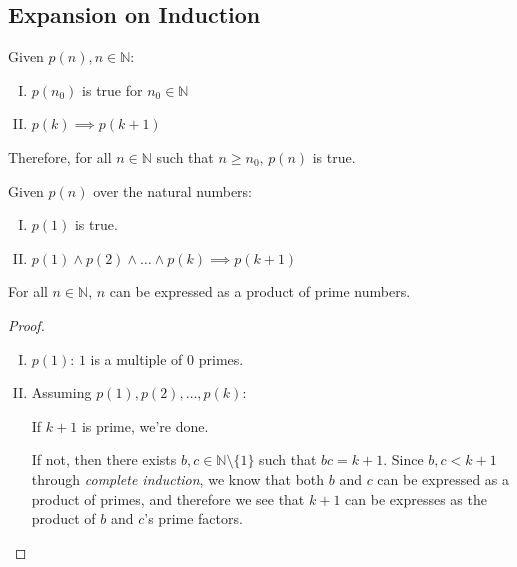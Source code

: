 \documentclass[00_complete]{subfiles}
\begin{document}
\subsection{Expansion on Induction}
\setcounter{example}{0}
\begin{theorem}
    Given $p(n), n \in \mathbb{N}$:
    \begin{enumerate}[I.]
        \item $p(n_0)$ is true for $n_0 \in \mathbb{N}$
        \item $p(k)\implies p(k+1)$
    \end{enumerate}
    Therefore, for all $n \in \mathbb{N}$ such that $n \geq n_0$, $p(n)$ is
    true.
\end{theorem}
\begin{theorem}
    Given $p(n)$ over the natural numbers:
    \begin{enumerate}[I.]
        \item $p(1)$ is true.
        \item $p(1)\land p(2) \land \dots \land p(k) \implies p(k+1)$
    \end{enumerate}
\end{theorem}
\begin{example}
    For all $n \in \mathbb{N}$, $n$ can be expressed as a product of prime
    numbers.
    \begin{proof}
        \begin{enumerate}[I.]
            \item $p(1)$: $1$ is a multiple of $0$ primes.
            \item Assuming $p(1), p(2), \dots, p(k)$:

                If $k+1$ is prime, we're done.

                If not, then there exists $b,c \in \mathbb{N} \setminus \{1\}$
                such that $bc=k+1$. Since $b,c < k+1$ through \emph{complete
                induction}, we know that both $b$ and $c$ can be expressed as a
                product of primes, and therefore we see that $k+1$ can be
                expresses as the product of $b$ and $c$'s prime factors.
        \end{enumerate}
    \end{proof}
\end{example}
\end{document}
